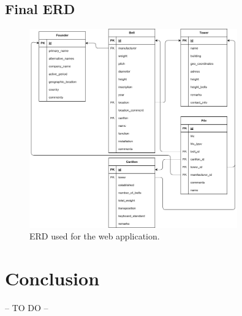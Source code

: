 \documentclass[11pt, a4paper]{article}
\begin{document}
\subsection{Final ERD}

\begin{figure}[h!]
    \centering
    \includegraphics[width=0.8\textwidth]{images/erd_inventaris_gent.png}
    \caption{ERD used for the web application.}
    \label{fig:erd-ghent}
\end{figure}

\section{Conclusion}

-- TO DO --
\end{document}
